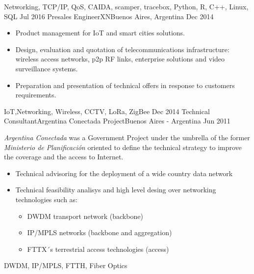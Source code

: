 \begin{experiences}
{\begin{itemize}
                      \end{itemize}
                    }
                    {Networking, TCP/IP, QoS, CAIDA, scamper, tracebox, Python, R, C++, Linux, SQL}
  \emptySeparator
  \experience
  {Jul 2016}       {Presales Engineer}{XN}{Buenos Aires, Argentina}
  {Dec 2014}   {
                      \begin{itemize}
                      \item Product management for IoT  and smart cities solutions.
                      \item Design, evaluation and quotation of telecommunications infrastructure: wireless access networks, p2p RF links, enterprise solutions and video surveillance systems.
                      \item Preparation and presentation of technical offers in response to customers requirements.
                      \end{itemize}
                    }
                    {IoT,Networking, Wireless, CCTV, LoRa, ZigBee}
  \emptySeparator         
  \experience
  {Dec 2014}  {Technical Consultant}{Argentina Conectada Project}{Buenos Aires - Argentina}
  {Jun 2011}   {
                      \emph{Argentina Conectada} was a Government Project under the umbrella of the former \emph{Ministerio de Planificación} oriented to define the technical strategy to improve the coverage and the access to Internet.
                      \begin{itemize}
                        \item Technical advisoring for the deployment of a wide country data network
                        \item Technical feasibility analisys and high level desing over networking technologies such as:
                        \begin{itemize}
                        \item DWDM transport network (backbone)
                        \item IP/MPLS networks (backbone and aggregation)
                        \item FTTX´s terrestrial access technologies (access)                                            
                        \end{itemize}
                      \end{itemize}
                  }
                  {DWDM, IP/MPLS, FTTH, Fiber Optics}  


\end{experiences}
